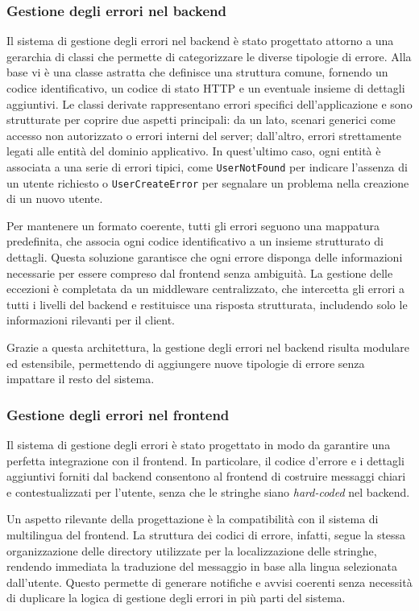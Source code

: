 \subsubsection{Gestione degli errori nel backend}
Il sistema di gestione degli errori nel backend è stato progettato attorno a una gerarchia di classi che permette di categorizzare le diverse tipologie di errore. Alla base vi è una classe astratta che definisce una struttura comune, fornendo un codice identificativo, un codice di stato HTTP e un eventuale insieme di dettagli aggiuntivi. Le classi derivate rappresentano errori specifici dell’applicazione e sono strutturate per coprire due aspetti principali: da un lato, scenari generici come accesso non autorizzato o errori interni del server; dall’altro, errori strettamente legati alle entità del dominio applicativo. In quest’ultimo caso, ogni entità è associata a una serie di errori tipici, come \texttt{UserNotFound} per indicare l’assenza di un utente richiesto o \texttt{UserCreateError} per segnalare un problema nella creazione di un nuovo utente.

Per mantenere un formato coerente, tutti gli errori seguono una mappatura predefinita, che associa ogni codice identificativo a un insieme strutturato di dettagli. Questa soluzione garantisce che ogni errore disponga delle informazioni necessarie per essere compreso dal frontend senza ambiguità. La gestione delle eccezioni è completata da un middleware centralizzato, che intercetta gli errori a tutti i livelli del backend e restituisce una risposta strutturata, includendo solo le informazioni rilevanti per il client.

Grazie a questa architettura, la gestione degli errori nel backend risulta modulare ed estensibile, permettendo di aggiungere nuove tipologie di errore senza impattare il resto del sistema.

\subsubsection{Gestione degli errori nel frontend}
Il sistema di gestione degli errori è stato progettato in modo da garantire una perfetta integrazione con il frontend. In particolare, il codice d'errore e i dettagli aggiuntivi forniti dal backend consentono al frontend di costruire messaggi chiari e contestualizzati per l'utente, senza che le stringhe siano \textit{hard-coded} nel backend.

Un aspetto rilevante della progettazione è la compatibilità con il sistema di multilingua del frontend. La struttura dei codici di errore, infatti, segue la stessa organizzazione delle directory utilizzate per la localizzazione delle stringhe, rendendo immediata la traduzione del messaggio in base alla lingua selezionata dall'utente. Questo permette di generare notifiche e avvisi coerenti senza necessità di duplicare la logica di gestione degli errori in più parti del sistema.

